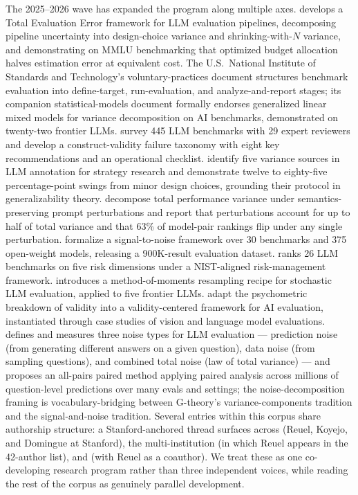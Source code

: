 \documentclass[11pt]{article}
\begin{document}
The 2025--2026 wave has expanded the program along multiple axes. \citet{messing2026hidden} develops a Total Evaluation Error framework for LLM evaluation pipelines, decomposing pipeline uncertainty into design-choice variance and shrinking-with-$N$ variance, and demonstrating on MMLU benchmarking that optimized budget allocation halves estimation error at equivalent cost. The U.S.\ National Institute of Standards and Technology's voluntary-practices document \citep{nist2026benchmarkpractices} structures benchmark evaluation into define-target, run-evaluation, and analyze-and-report stages; its companion statistical-models document \citep{nist2026statmodels} formally endorses generalized linear mixed models for variance decomposition on AI benchmarks, demonstrated on twenty-two frontier LLMs. \citet{bean2025measuring} survey 445 LLM benchmarks with 29 expert reviewers and develop a construct-validity failure taxonomy with eight key recommendations and an operational checklist. \citet{camuffo2026variance} identify five variance sources in LLM annotation for strategy research and demonstrate twelve to eighty-five percentage-point swings from minor design choices, grounding their protocol in generalizability theory. \citet{romanou2026brittlebench} decompose total performance variance under semantics-preserving prompt perturbations and report that perturbations account for up to half of total variance and that 63\% of model-pair rankings flip under any single perturbation. \citet{heineman2025signal} formalize a signal-to-noise framework over 30 benchmarks and 375 open-weight models, releasing a 900K-result evaluation dataset. \citet{mcgregor2025benchrisk} ranks 26 LLM benchmarks on five risk dimensions under a NIST-aligned risk-management framework. \citet{lior2025reliableeval} introduces a method-of-moments resampling recipe for stochastic LLM evaluation, applied to five frontier LLMs. \citet{salaudeen2025measurement} adapt the psychometric breakdown of validity into a validity-centered framework for AI evaluation, instantiated through case studies of vision and language model evaluations. \citet{wang2025measuringnoises} defines and measures three noise types for LLM evaluation --- prediction noise (from generating different answers on a given question), data noise (from sampling questions), and combined total noise (law of total variance) --- and proposes an all-pairs paired method applying paired analysis across millions of question-level predictions over many evals and settings; the noise-decomposition framing is vocabulary-bridging between G-theory's variance-components tradition and the signal-and-noise tradition. Several entries within this corpus share authorship structure: a Stanford-anchored thread surfaces across \citet{salaudeen2025measurement} (Reuel, Koyejo, and Domingue at Stanford), the multi-institution \citet{bean2025measuring} (in which Reuel appears in the 42-author list), and \citet{mcgregor2025benchrisk} (with Reuel as a coauthor). We treat these as one co-developing research program rather than three independent voices, while reading the rest of the corpus as genuinely parallel development.
\end{document}
